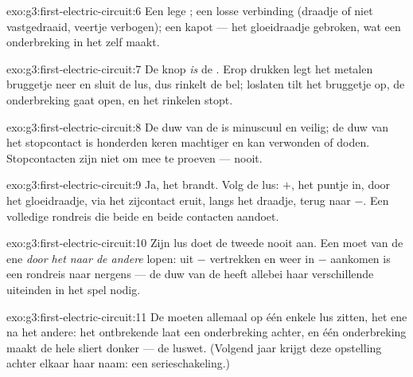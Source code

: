 \begin{solution}{exo:g3:first-electric-circuit:6}
Een lege ; een losse verbinding (draadje of  niet
vastgedraaid, veertje verbogen); een kapot  --- het gloeidraadje
gebroken, wat een onderbreking in het  zelf maakt.
\end{solution}

\begin{solution}{exo:g3:first-electric-circuit:7}
De knop \emph{is} de . Erop drukken legt het metalen bruggetje
neer en sluit de lus, dus rinkelt de bel; loslaten tilt het bruggetje
op, de onderbreking gaat open, en het rinkelen stopt.
\end{solution}

\begin{solution}{exo:g3:first-electric-circuit:8}
De duw van de  is minuscuul en veilig; de duw van het
stopcontact is honderden keren machtiger en kan verwonden of doden.
Stopcontacten zijn niet om mee te proeven --- nooit.
\end{solution}

\begin{solution}{exo:g3:first-electric-circuit:9}
Ja, het brandt. Volg de lus: $+$, het puntje in, door het
gloeidraadje, via het zijcontact eruit, langs het draadje, terug naar
$-$. Een volledige rondreis die beide  en beide contacten
aandoet.
\end{solution}

\begin{solution}{exo:g3:first-electric-circuit:10}
Zijn lus doet de tweede  nooit aan. Een  moet van de ene
 \emph{door het  naar de andere}  lopen: uit $-$
vertrekken en weer in $-$ aankomen is een rondreis naar nergens --- de
duw van de  heeft allebei haar verschillende uiteinden in het
spel nodig.
\end{solution}

\begin{solution}{exo:g3:first-electric-circuit:11}
De  moeten allemaal op één enkele lus zitten, het ene na het
andere: het ontbrekende  laat een onderbreking achter, en één
onderbreking maakt de hele sliert donker --- de luswet. (Volgend jaar
krijgt deze opstelling achter elkaar haar naam: een serieschakeling.)
\end{solution}
